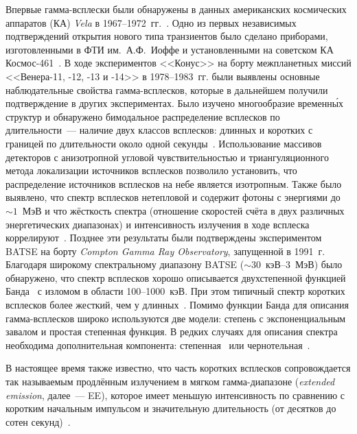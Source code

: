 Впервые гамма-всплески были обнаружены в данных американских космических 
аппаратов (КА) \textit{Vela} в 1967--1972~гг.~\citep{Klebesadel_1973ApJ}. 
Одно из первых независимых подтверждений открытия нового типа транзиентов 
было сделано приборами, изготовленными в ФТИ им.~А.Ф.~Иоффе и установленными 
на советском КА Космос-461~\citep{Mazets_1974PZETF_ru}. В ходе экспериментов <<Конус>> 
на борту межпланетных миссий <<Венера-11, -12, -13 и -14>> в 1978--1983~гг. были выявлены
основные наблюдательные свойства гамма-всплесков, которые в дальнейшем получили 
подтверждение в других экспериментах. Было изучено многообразие временн\'{ы}х структур
и обнаружено бимодальное распределение всплесков по длительности~--- 
наличие двух классов всплесков: длинных и коротких с границей по длительности 
около одной секунды~\citep{Mazets_1981_part_1}.
Использование массивов детекторов с анизотропной угловой чувствительностью
и триангуляционного метода локализации источников всплесков позволило установить, 
что распределение источников всплесков на небе является изотропным. Также было выявлено,
что спектр всплесков нетепловой и содержит фотоны с энергиями до $\sim 1$~МэВ и 
что жёсткость спектра (отношение скоростей счёта в двух различных энергетических диапазонах) 
и интенсивность излучения в ходе всплеска 
коррелируют~\citep{Mazets_1981_part_1,Golenetskii_1983Natur}.
Позднее эти результаты были подтверждены экспериментом BATSE на борту 
\textit{Compton Gamma Ray Observatory}, запущенной в 1991~г. 
Благодаря широкому спектральному диапазону BATSE ($\sim30$~кэВ--3~МэВ) было обнаружено, 
что спектр всплесков хорошо описывается двухстепенной функцией Банда~\citep{Band_1993ApJ} 
с изломом в области 100--1000~кэВ. При этом типичный спектр 
коротких всплесков более жесткий, чем у длинных~\citep{Kouveliotou_1993}. 
Помимо функции Банда для описания гамма-всплесков широко используются две модели:
степень с экспоненциальным завалом и простая степенная функция. В редких случаях 
для описания спектра необходима дополнительная компонента: 
степенная~\citep[см., например,][]{Abdo_2009ApJ} или чернотельная~\citep[см., например,][]{Guiriec_2011ApJ}.

В настоящее время также известно, что часть коротких всплесков
сопровождается так называемым продлённым излучением в мягком гамма-диапазоне 
(\textit{extended emission}, далее~--- EE), которое имеет меньшую интенсивность 
по сравнению с коротким начальным импульсом и значительную длительность 
(от десятков до сотен секунд)~\citep{Burenin_2000AstL,Mazets_2002astro_ph,Frederiks_2004ASPC,Norris_and_Bonnel_2006ApJ}.

